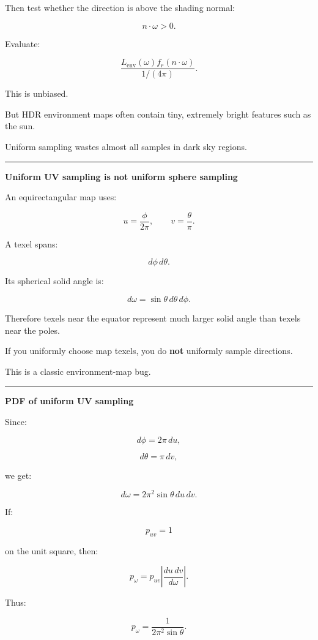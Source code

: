 Then test whether the direction is above the shading normal:

\[
n\cdot\omega>0.
\]

Evaluate:

\[
\frac{
L_{\text{env}}(\omega)
f_r
(n\cdot\omega)
}{
1/(4\pi)
}.
\]

This is unbiased.

But HDR environment maps often contain tiny, extremely bright features such as the sun.

Uniform sampling wastes almost all samples in dark sky regions.

\begin{center}\rule{0.5\linewidth}{0.5pt}\end{center}

\textbf{Uniform UV sampling is not uniform sphere sampling}

An equirectangular map uses:

\[
u=\frac{\phi}{2\pi},
\qquad
v=\frac{\theta}{\pi}.
\]

A texel spans:

\[
d\phi\,d\theta.
\]

Its spherical solid angle is:

\[
\boxed{
d\omega
=
\sin\theta
\,d\theta\,d\phi.
}
\]

Therefore texels near the equator represent much larger solid angle than texels near the poles.

If you uniformly choose map texels, you do \textbf{not} uniformly sample directions.

This is a classic environment-map bug.

\begin{center}\rule{0.5\linewidth}{0.5pt}\end{center}

\textbf{PDF of uniform UV sampling}

Since:

\[
d\phi=2\pi\,du,
\]

\[
d\theta=\pi\,dv,
\]

we get:

\[
d\omega
=
2\pi^2
\sin\theta
\,du\,dv.
\]

If:

\[
p_{uv}=1
\]

on the unit square, then:

\[
p_\omega
=
p_{uv}
\left|
\frac{
du\,dv
}{
d\omega
}
\right|.
\]

Thus:

\[
\boxed{
p_\omega
=
\frac{
1
}{
2\pi^2\sin\theta
}.
}
\]

